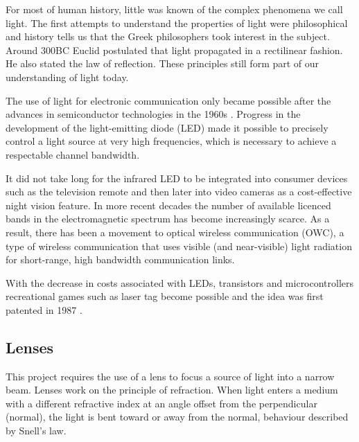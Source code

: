 For most of human history, little was known of the complex phenomena we call light. The first attempts to understand the properties of light were philosophical and history tells us that the Greek philosophers took interest in the subject. Around 300BC Euclid postulated that light propagated in a rectilinear fashion. He also stated the law of reflection. These principles still form part of our understanding of light today. \cite{Vohnsen2004}


The use of light for electronic communication only became possible after the advances in semiconductor technologies in the 1960s \cite{Huurdeman2003}. Progress in the development of the light-emitting diode (LED) made it possible to precisely control a light source at very high frequencies, which is necessary to achieve a respectable channel bandwidth.

It did not take long for the infrared LED to be integrated into consumer devices such as the television remote and then later into video cameras as a cost-effective night vision feature. In more recent decades the number of available licenced bands in the electromagnetic spectrum has become increasingly scarce. As a result, there has been a movement to optical wireless communication (OWC), a type of wireless communication that uses visible (and near-visible) light radiation for short-range, high bandwidth communication links.

With the decrease in costs associated with LEDs, transistors and microcontrollers recreational games such as laser tag become possible and the idea was first patented in 1987 \cite{Carter1986}.



\subsection{Lenses}
\label{sec:lit_lenses}
This project requires the use of a lens to focus a source of light into a narrow beam. Lenses work on the principle of refraction. When light enters a medium with a different refractive index at an angle offset from the perpendicular (normal), the light is bent toward or away from the normal, behaviour described by Snell's law.

